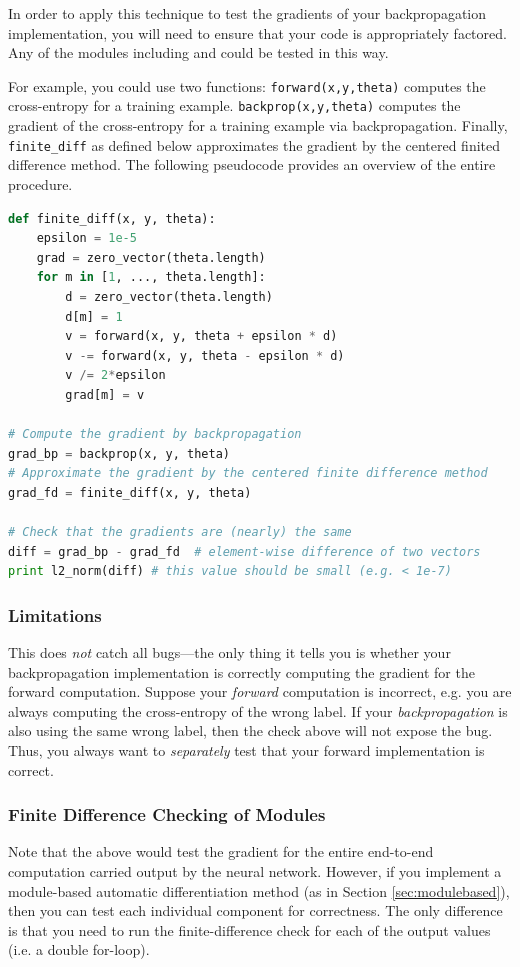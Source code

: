 \documentclass[11pt]{article}
\numberwithin{equation}{section} %
\numberwithin{figure}{section} %
\numberwithin{table}{section} %
\begin{document}
In order to apply this technique to test the gradients of your backpropagation implementation, you will need to ensure that your code is appropriately factored. Any of the modules including  and  could be tested in this way.
%

For example, you could use two functions: \lstinline{forward(x,y,theta)} computes the cross-entropy for a training example. \lstinline{backprop(x,y,theta)} computes the gradient of the cross-entropy for a training example via backpropagation. Finally, \lstinline{finite_diff} as defined below approximates the gradient by the centered finited difference method. The following pseudocode provides an overview of the entire procedure.

\begin{lstlisting}[language=Python]
def finite_diff(x, y, theta):
    epsilon = 1e-5
    grad = zero_vector(theta.length)
    for m in [1, ..., theta.length]:
        d = zero_vector(theta.length)
        d[m] = 1
        v = forward(x, y, theta + epsilon * d)
        v -= forward(x, y, theta - epsilon * d)
        v /= 2*epsilon
        grad[m] = v
        
# Compute the gradient by backpropagation
grad_bp = backprop(x, y, theta)
# Approximate the gradient by the centered finite difference method
grad_fd = finite_diff(x, y, theta)

# Check that the gradients are (nearly) the same
diff = grad_bp - grad_fd  # element-wise difference of two vectors
print l2_norm(diff) # this value should be small (e.g. < 1e-7)
\end{lstlisting}

\subsubsection{Limitations}

This does \emph{not} catch all bugs---the only thing it tells you is whether your backpropagation implementation is correctly computing the gradient for the forward computation. Suppose your \emph{forward} computation is incorrect, e.g. you are always computing the cross-entropy of the wrong label. If your \emph{backpropagation} is also using the same wrong label, then the check above will not expose the bug. Thus, you always want to \emph{separately} test that your forward implementation is correct.

\subsubsection{Finite Difference Checking of Modules}

Note that the above would test the gradient for the entire end-to-end computation carried output by the neural network. However, if you implement a module-based automatic differentiation method (as in Section \ref{sec:modulebased}), then you can test each individual component for correctness. The only difference is that you need to run the finite-difference check for each of the output values (i.e. a double for-loop). 
\end{document}
